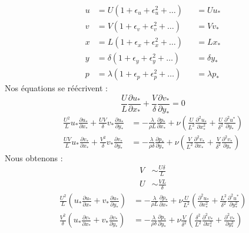 \documentclass[french]{article}
\begin{document}
\begin{align*}
	u &= U(1 + \epsilon_{u} + \epsilon_{u}^{2} + \dots)&  &= Uu_{*}\\
	v &= V(1 + \epsilon_{v} + \epsilon_{v}^{2} + \dots)& &= Vv_{*}\\
	x &= L(1 + \epsilon_{x} + \epsilon_{x}^{2} + \dots)& &= Lx_{*}\\
	y &= \delta(1 + \epsilon_{y} + \epsilon_{y}^{2} + \dots)& &= \delta y_{*}\\
	p &= \lambda(1 + \epsilon_{p} + \epsilon_{p}^{2} + \dots)& &= \lambda p_{*}
\end{align*}
Nos équations se réécrivent :
\begin{equation}
	\frac{U}{L}\frac{\partial u_{*}}{\partial x_{*}} + \frac{V}{\delta}\frac{\partial v_{*}}{\partial y_{*}} = 0
\end{equation}
\begin{align}%
	\frac{U^{2}}{L}u_{*}
	\frac{\partial u_{*}}{\partial x_{*}} + 
	\frac{UV}{\delta}v_{*}\frac{\partial u_{*}}{\partial y_{*}} 
	&= - \frac{\lambda}{\rho L}
	\frac{\partial p_{*}}{\partial  x_{*}} +
	\nu  \left (
	\frac{U}{L^{2}}\frac{\partial^{2} u_{*}}{\partial  x_{*}^{2}} + 
	\frac{U}{\delta ^ {2}}
	\frac{\partial^{2} u^{*}}{\partial  y_{*}}\right ) \\
	\frac{UV}{L}u_{*}\frac{\partial v_{*}}{\partial x_{*}} + 
	\frac{V^{2}}{\delta}v_{*}\frac{\partial v_{*}}{\partial y_{*}} 
	&= - \frac{\lambda}{\rho\delta}
	\frac{\partial p_{*}}{\partial  y_{*}} +
	\nu\left (\frac{V}{L^{2}}
	\frac{\partial^{2} v_{*}}{\partial  x_{*}} + 
	\frac{V}{\delta^{2}}
	\frac{\partial^{2} v_{*}}{\partial  y_{*}}\right ) 
\end{align}
Nous obtenons :
\begin{align*}
	V &\sim \frac{U\delta}{L}\\
	U &\sim \frac{VL}{\delta}
\end{align*}
\begin{align}
	\frac{U^{2}}{L}\left (
	u_{*}\frac{\partial u_{*}}{\partial x_{*}} + 
	v_{*}\frac{\partial u_{*}}{\partial y_{*}} 
	\right )
	&= - \frac{\lambda}{\rho L}
	\frac{\partial p_{*}}{\partial  x_{*}} +
	\nu  \frac{U}{L^{2}}\left (
	\frac{\partial^{2} u_{*}}{\partial  x_{*}^{2}} + 
	\frac{L^{2}}{\delta ^ {2}}
	\frac{\partial^{2} u^{*}}{\partial  y_{*}^{2}}\right ) \\
	\frac{V^{2}}{\delta}\left (
	u_{*}\frac{\partial v_{*}}{\partial x_{*}} + 
	v_{*}\frac{\partial v_{*}}{\partial y_{*}} 
	\right )
	&= - \frac{\lambda}{\rho\delta}
	\frac{\partial p_{*}}{\partial  y_{*}} +
	\nu\frac{V}{\delta^{2}}\left (
	\frac{\delta^{2}}{L^{2}}
	\frac{\partial^{2} v_{*}}{\partial  x_{*}^{2}} + 
	\frac{\partial^{2} v_{*}}{\partial  y_{*}^{2}}\right ) 
\end{align}
\end{document}
